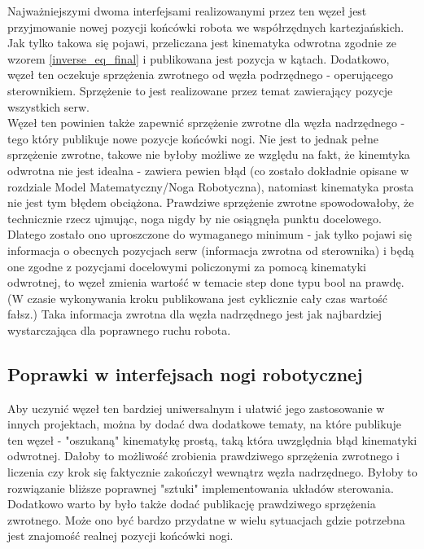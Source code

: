 Najważniejszymi dwoma interfejsami realizowanymi przez ten węzeł jest przyjmowanie nowej pozycji końcówki robota we współrzędnych kartezjańskich. Jak tylko takowa się pojawi, przeliczana jest kinematyka odwrotna zgodnie ze wzorem \ref{inverse_eq_final} i publikowana jest pozycja w kątach. Dodatkowo, węzeł ten oczekuje sprzężenia zwrotnego od węzła podrzędnego - operującego sterownikiem. Sprzężenie to jest realizowane przez temat zawierający pozycje wszystkich serw. \\

Węzeł ten powinien także zapewnić sprzężenie zwrotne dla węzła nadrzędnego - tego który publikuje nowe pozycje końcówki nogi. Nie jest to jednak pełne sprzężenie zwrotne, takowe nie byłoby możliwe ze względu na fakt, że kinemtyka odwrotna nie jest idealna - zawiera pewien błąd (co zostało dokładnie opisane w rozdziale Model Matematyczny/Noga Robotyczna), natomiast kinematyka prosta nie jest tym błędem obciążona. Prawdziwe sprzężenie zwrotne spowodowałoby, że technicznie rzecz ujmując, noga nigdy by nie osiągnęła punktu docelowego. Dlatego zostało ono uproszczone do wymaganego minimum - jak tylko pojawi się informacja o obecnych pozycjach serw (informacja zwrotna od sterownika) i będą one zgodne z pozycjami docelowymi policzonymi za pomocą kinematyki odwrotnej, to węzeł zmienia wartość w temacie step done typu bool na prawdę. (W czasie wykonywania kroku publikowana jest cyklicznie cały czas wartość fałsz.) Taka informacja zwrotna dla węzła nadrzędnego jest jak najbardziej wystarczająca dla poprawnego ruchu robota.\\

\subsection{Poprawki w interfejsach nogi robotycznej}

Aby uczynić węzeł ten bardziej uniwersalnym i ułatwić jego zastosowanie w innych projektach, można by dodać dwa dodatkowe tematy, na które publikuje ten węzeł - "oszukaną" kinematykę prostą, taką która uwzględnia błąd kinematyki odwrotnej. Dałoby to możliwość zrobienia prawdziwego sprzężenia zwrotnego i liczenia czy krok się faktycznie zakończył wewnątrz węzła nadrzędnego. Byłoby to rozwiązanie bliższe poprawnej "sztuki" implementowania układów sterowania. Dodatkowo warto by było także dodać publikację prawdziwego sprzężenia zwrotnego. Może ono być bardzo przydatne w wielu sytuacjach gdzie potrzebna jest znajomość realnej pozycji końcówki nogi.\\

